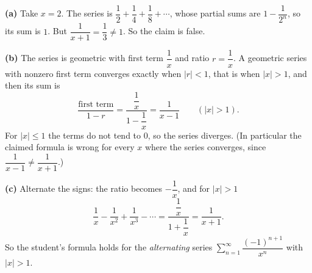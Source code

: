 \textbf{(a)} Take $x=2$. The series is $\dfrac{1}{2}+\dfrac{1}{4}+\dfrac{1}{8}+\cdots$, whose partial sums are $1-\dfrac{1}{2^n}$, so its sum is $1$. But $\dfrac{1}{x+1}=\dfrac{1}{3}\ne1$. So the claim is false.

\textbf{(b)} The series is geometric with first term $\dfrac{1}{x}$ and ratio $r=\dfrac{1}{x}$. A geometric series with nonzero first term converges exactly when $|r|<1$, that is when $|x|>1$, and then its sum is
\[
\dfrac{\text{first term}}{1-r}=\dfrac{\dfrac{1}{x}}{1-\dfrac{1}{x}}=\boxed{\dfrac{1}{x-1}}\qquad(|x|>1).
\]
For $|x|\le1$ the terms do not tend to $0$, so the series diverges. (In particular the claimed formula is wrong for every $x$ where the series converges, since $\dfrac{1}{x-1}\ne\dfrac{1}{x+1}$.)

\textbf{(c)} Alternate the signs: the ratio becomes $-\dfrac{1}{x}$, and for $|x|>1$
\[
\dfrac{1}{x}-\dfrac{1}{x^2}+\dfrac{1}{x^3}-\cdots=\dfrac{\dfrac{1}{x}}{1+\dfrac{1}{x}}=\dfrac{1}{x+1}.
\]
So the student's formula holds for the \emph{alternating} series $\displaystyle\sum_{n=1}^\infty\dfrac{(-1)^{n+1}}{x^n}$ with $|x|>1$.
